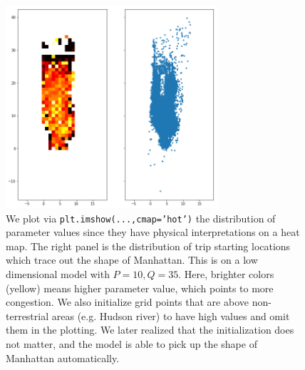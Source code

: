 \documentclass[11pt]{article}
\begin{document}
\begin{figure}[!h]
\centering
\includegraphics[width=0.7\textwidth]{low-dim1.png}
\caption{We plot via \texttt{plt.imshow(...,cmap='hot')} the distribution of parameter values since they have physical interpretations on a heat map. The right panel is the distribution of trip starting locations which trace out the shape of Manhattan. This is on a low dimensional model with $P=10, Q = 35$. Here, brighter colors (yellow) means higher parameter value, which points to more congestion. We also initialize grid points that are above non-terrestrial areas (e.g. Hudson river) to have high values and omit them in the plotting. We later realized that the initialization does not matter, and the model is able to pick up the shape of Manhattan automatically.}
\label{small}
\end{figure}
\end{document}
